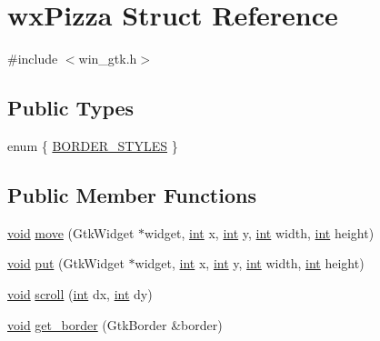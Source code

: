 \hypertarget{structwx_pizza}{}\section{wx\+Pizza Struct Reference}
\label{structwx_pizza}


{\ttfamily \#include $<$win\+\_\+gtk.\+h$>$}

\subsection*{Public Types}
\begin{DoxyCompactItemize}
\item 
enum \{ \hyperlink{structwx_pizza_ad50ed502a1f62b6ec6d4224f814813f7a601e5373b02f4a592b5fdd1ea3f67e87}{B\+O\+R\+D\+E\+R\+\_\+\+S\+T\+Y\+L\+ES}
 \}
\end{DoxyCompactItemize}
\subsection*{Public Member Functions}
\begin{DoxyCompactItemize}
\item 
\hyperlink{sound_8c_ae35f5844602719cf66324f4de2a658b3}{void} \hyperlink{structwx_pizza_a2fd2cd917bd1e045c7981dfe574c472d}{move} (Gtk\+Widget $\ast$widget, \hyperlink{xmltok_8h_a5a0d4a5641ce434f1d23533f2b2e6653}{int} x, \hyperlink{xmltok_8h_a5a0d4a5641ce434f1d23533f2b2e6653}{int} y, \hyperlink{xmltok_8h_a5a0d4a5641ce434f1d23533f2b2e6653}{int} width, \hyperlink{xmltok_8h_a5a0d4a5641ce434f1d23533f2b2e6653}{int} height)
\item 
\hyperlink{sound_8c_ae35f5844602719cf66324f4de2a658b3}{void} \hyperlink{structwx_pizza_aad2524f3d08e41465d27f40c17c015bf}{put} (Gtk\+Widget $\ast$widget, \hyperlink{xmltok_8h_a5a0d4a5641ce434f1d23533f2b2e6653}{int} x, \hyperlink{xmltok_8h_a5a0d4a5641ce434f1d23533f2b2e6653}{int} y, \hyperlink{xmltok_8h_a5a0d4a5641ce434f1d23533f2b2e6653}{int} width, \hyperlink{xmltok_8h_a5a0d4a5641ce434f1d23533f2b2e6653}{int} height)
\item 
\hyperlink{sound_8c_ae35f5844602719cf66324f4de2a658b3}{void} \hyperlink{structwx_pizza_a515f6a51a644654e804bcde439ca39e7}{scroll} (\hyperlink{xmltok_8h_a5a0d4a5641ce434f1d23533f2b2e6653}{int} dx, \hyperlink{xmltok_8h_a5a0d4a5641ce434f1d23533f2b2e6653}{int} dy)
\item 
\hyperlink{sound_8c_ae35f5844602719cf66324f4de2a658b3}{void} \hyperlink{structwx_pizza_a7a584ec5077a00a94fb087ec5d54fc03}{get\+\_\+border} (Gtk\+Border \&border)
\end{DoxyCompactItemize}
